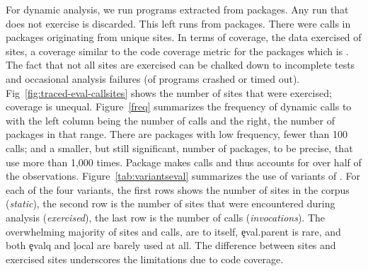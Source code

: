 \documentclass[review,screen,acmsmall,anonymous=true]{acmart}
\begin{document}
For dynamic analysis, we run \CranRunnableScripts programs extracted from
\CranPackages packages. Any run that does not exercise \eval is discarded. This
left \packageNbruns runs from \packageCorpus packages. There were
\packageAllcalls calls in \packageTriggeredpkgs packages originating from
\PkgHitEvalCallSites unique sites. In terms of coverage, the data exercised
\PkgHitEvalCallSitesAvgRatio of sites, a coverage similar to the code coverage
metric for the packages which is \PkgCodeCoverage. The fact that not all sites
are exercised can be chalked down to incomplete tests and occasional analysis
failures (\PkgFailedProgramsRatio of programs crashed or timed out).
Fig~\ref{fig:traced-eval-callsites} shows the number of sites that were
exercised; coverage is unequal. Figure~\ref{freq} summarizes the frequency of
dynamic calls to \eval with the left column being the number of calls and the
right, the number of packages in that range. There are \packageFewcalls packages
with low \eval frequency, fewer than 100 calls; and a smaller, but still
significant, number of packages, \packageManycalls to be precise, that use \eval
more than 1,000 times. Package \packageMaxcallspack makes \packageMaxcalls calls
and thus accounts for over half of the observations.
Figure~\ref{tab:variantseval} summarizes the use of variants of \eval. For each
of the four variants, the first rows shows the number of sites in the corpus
(\emph{static}), the second row is the number of sites that were encountered
during analysis (\emph{exercised}), the last row is the number of calls
(\emph{invocations}). The overwhelming majority of sites and calls, are to \eval
itself, \c{eval.parent} is rare, and both \c{evalq} and \c{local} are barely
used at all. The difference between sites and exercised sites underscores the
limitations due to code coverage.
\end{document}
